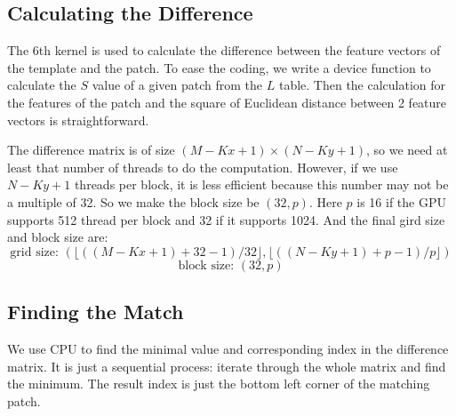 \documentclass[12pt, a4paper]{article}
\begin{document}
  \subsection{Calculating the Difference}
    The 6th kernel is used to calculate the difference between the feature vectors
    of the template and the patch. To ease the coding, we write a
    device function to calculate the $S$ value of a given patch from the $L$
    table. Then the calculation for the features of the patch and the square of
    Euclidean distance between 2 feature vectors is straightforward.

    The difference matrix is of size $(M-Kx+1)\times(N-Ky+1)$, so we need at least
    that number of threads to do the computation. However, if we use $N-Ky+1$
    threads per block, it is less efficient because this number may not be a
    multiple of 32. So we make the block size be $(32, p)$. Here $p$ is 16 if
    the GPU supports 512 thread per block and 32 if it supports 1024. And the
    final gird size and block size are:
    \[\text{grid size: }(\lfloor((M-Kx+1)+32-1)/32\rfloor, \lfloor((N-Ky+1)+p-1)/p\rfloor)\]
    \[\text{block size: }(32, p)\]
  \subsection{Finding the Match}
    We use CPU to find the minimal value and corresponding index in the difference
    matrix. It is just a sequential process: iterate through the whole matrix
    and find the minimum. The result index is just the bottom left corner of the
    matching patch.
\end{document}
